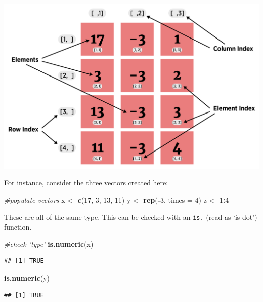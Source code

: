 \documentclass[
]{book}
\newenvironment{Shaded}{\begin{snugshade}}{\end{snugshade}}
\newcommand{\CommentTok}[1]{\textcolor[rgb]{0.56,0.35,0.01}{\textit{#1}}}
\newcommand{\DataTypeTok}[1]{\textcolor[rgb]{0.13,0.29,0.53}{#1}}
\newcommand{\DecValTok}[1]{\textcolor[rgb]{0.00,0.00,0.81}{#1}}
\newcommand{\KeywordTok}[1]{\textcolor[rgb]{0.13,0.29,0.53}{\textbf{#1}}}
\newcommand{\NormalTok}[1]{#1}
\newcommand{\OperatorTok}[1]{\textcolor[rgb]{0.81,0.36,0.00}{\textbf{#1}}}
\newcommand{\StringTok}[1]{\textcolor[rgb]{0.31,0.60,0.02}{#1}}
\theoremstyle{definition}
\theoremstyle{definition}
\theoremstyle{definition}
\theoremstyle{remark}
\begin{document}
\begin{center}\includegraphics[width=0.75\linewidth]{img/matrixVisualF} \end{center}

For instance, consider the three vectors created here:

\begin{Shaded}
\begin{Highlighting}[]
\CommentTok{#populate vectors}
\NormalTok{x <-}\StringTok{ }\KeywordTok{c}\NormalTok{(}\DecValTok{17}\NormalTok{, }\DecValTok{3}\NormalTok{, }\DecValTok{13}\NormalTok{, }\DecValTok{11}\NormalTok{)}
\NormalTok{y <-}\StringTok{ }\KeywordTok{rep}\NormalTok{(}\OperatorTok{-}\DecValTok{3}\NormalTok{, }\DataTypeTok{times =} \DecValTok{4}\NormalTok{)}
\NormalTok{z <-}\StringTok{ }\DecValTok{1}\OperatorTok{:}\DecValTok{4}
\end{Highlighting}
\end{Shaded}

These are all of the same type. This can be checked with an \texttt{is.} (read as `is dot') function.

\begin{Shaded}
\begin{Highlighting}[]
\CommentTok{#check 'type'}
\KeywordTok{is.numeric}\NormalTok{(x)}
\end{Highlighting}
\end{Shaded}

\begin{verbatim}
## [1] TRUE
\end{verbatim}

\begin{Shaded}
\begin{Highlighting}[]
\KeywordTok{is.numeric}\NormalTok{(y)}
\end{Highlighting}
\end{Shaded}

\begin{verbatim}
## [1] TRUE
\end{verbatim}
\end{document}
